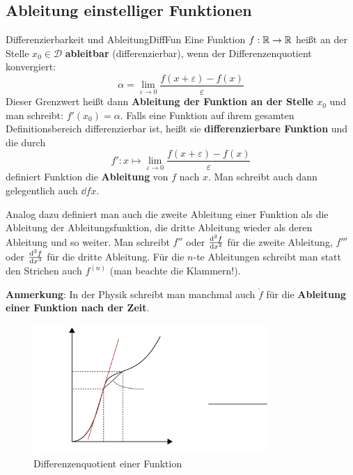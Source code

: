 \subsection{Ableitung einstelliger Funktionen}

\begin{definition}{Differenzierbarkeit und Ableitung}{DiffFun}
    Eine Funktion $f: \mathbb{R} \to \mathbb{R}$ heißt an der Stelle $x_0\in\mathcal{D}$ \textbf{ableitbar} (differenzierbar), wenn der Differenzenquotient konvergiert:
    $$
        \alpha = \lim\limits_{\varepsilon\to 0} \frac{f(x+\varepsilon) - f(x)}{\varepsilon}
    $$
    Dieser Grenzwert heißt dann \textbf{Ableitung der Funktion an der Stelle $x_0$} und man schreibt: $f'(x_0) = \alpha$.
    Falls eine Funktion auf ihrem gesamten Definitionsbereich differenzierbar ist, heißt sie \textbf{differenzierbare Funktion} und die durch
    $$
    f': x \mapsto \lim\limits_{\varepsilon\to 0} \frac{f(x+\varepsilon) - f(x)}{\varepsilon}
    $$
    definiert Funktion die \textbf{Ableitung} von $f$ nach $x$. Man schreibt auch dann gelegentlich auch $\dd{f}{x}$.
\end{definition}

Analog dazu definiert man auch die zweite Ableitung einer Funktion als die Ableitung der Ableitungsfunktion, die dritte Ableitung wieder als deren Ableitung und so weiter. Man schreibt $f''$ oder $\frac{\mathrm{d}^{2}{f}}{\mathrm{d}{x^{2}}}$ für die zweite Ableitung, $f'''$ oder $\frac{\mathrm{d}^{3}{f}}{\mathrm{d}{x^{3}}}$ für die dritte Ableitung. Für die $n$-te Ableitungen schreibt man statt den Strichen auch $f^{(n)}$ (man beachte die Klammern!).

\textbf{Anmerkung}: In der Physik schreibt man manchmal auch $\dot{f}$ für die \textbf{Ableitung einer Funktion nach der Zeit}.

\begin{figure}
    \centering
    \includegraphics[width=0.8\textwidth]{./svg/derivative-function}
    \caption{Differenzenquotient einer Funktion}
    \label{fig:DiffFun}
\end{figure}

